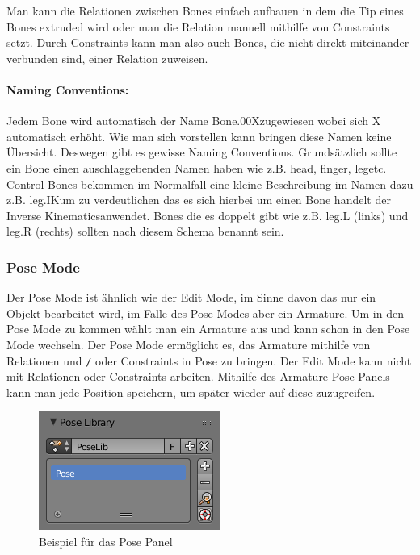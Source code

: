 Man kann die Relationen zwischen Bones einfach aufbauen in dem die Tip eines Bones extruded wird oder man die Relation manuell mithilfe von Constraints setzt.
Durch Constraints kann man also auch Bones, die nicht direkt miteinander verbunden sind, einer Relation zuweisen.

\paragraph{Naming Conventions:}
Jedem Bone wird automatisch der Name \dq Bone.00X\dq zugewiesen wobei sich X automatisch erhöht. Wie man sich vorstellen kann bringen diese Namen keine Übersicht.
Deswegen gibt es gewisse Naming Conventions. Grundsätzlich sollte ein Bone einen auschlaggebenden Namen haben wie z.B. \dq head\dq, \dq finger\dq, \dq leg\dq  etc.
Control Bones bekommen im Normalfall eine kleine Beschreibung im Namen dazu z.B. \dq leg.IK\dq um zu verdeutlichen das es sich hierbei um einen Bone handelt der \dq Inverse Kinematics\dq anwendet.
Bones die es doppelt gibt wie z.B. leg.L (links) und leg.R (rechts) sollten nach diesem Schema benannt sein.

\subsubsection{Pose Mode}
Der Pose Mode ist ähnlich wie der Edit Mode, im Sinne davon das nur ein Objekt bearbeitet wird, im Falle des Pose Modes aber ein Armature.
Um in den Pose Mode zu kommen wählt man ein Armature aus und kann schon in den Pose Mode wechseln.
Der Pose Mode ermöglicht es, das Armature mithilfe von Relationen und \verb-/- oder Constraints in Pose zu bringen. Der Edit Mode kann nicht mit Relationen oder Constraints arbeiten.
Mithilfe des Armature Pose Panels kann man jede Position speichern, um später wieder auf diese zuzugreifen.

\begin{figure}[H]
    \centering

    \includegraphics[width=.8\textwidth]{images/rigging_pose_panel.png}
    \caption{Beispiel für das Pose Panel}
\end{figure}

